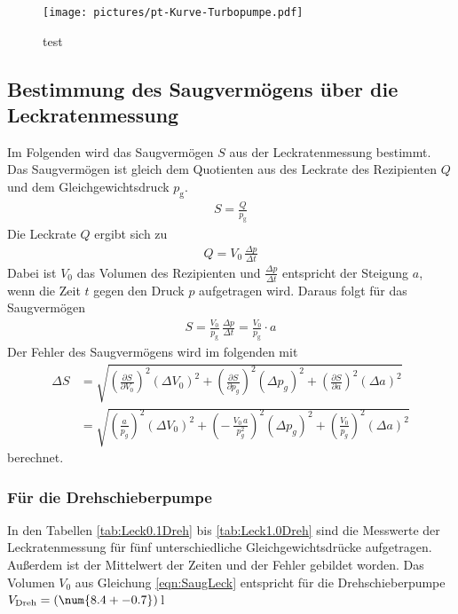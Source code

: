 \begin{figure}[H] %
  \centering
  \texttt{[image: pictures/pt-Kurve-Turbopumpe.pdf]}
  \caption{test}
  \label{fig:test}
\end{figure}





\subsection{Bestimmung des Saugvermögens über die Leckratenmessung}
Im Folgenden wird das Saugvermögen $S$ aus der Leckratenmessung bestimmt. Das Saugvermögen ist gleich dem Quotienten aus des Leckrate des Rezipienten $Q$ und dem Gleichgewichtsdruck $p_\text{g}$.
\begin{align}
  S = \frac{Q}{p_\text{g}}
\end{align}
Die Leckrate $Q$ ergibt sich zu
\begin{align}
  Q = V_0\, \frac{\Delta p}{\Delta t}
\end{align}
Dabei ist $V_0$ das Volumen des Rezipienten und $\frac{\Delta p}{\Delta t}$ entspricht der Steigung $a$, wenn die Zeit $t$ gegen den Druck $p$ aufgetragen wird. Daraus folgt für das Saugvermögen
\begin{align}\label{eqn:SaugLeck}
  S = \frac{V_0}{p_\text{g}}\, \frac{\Delta p}{\Delta t} = \frac{V_0}{p_\text{g}} \cdot a
\end{align}
Der Fehler des Saugvermögens wird im folgenden mit
\begin{align*}
  \Delta S &= \sqrt{ \left(\frac{\partial S}{\partial V_0} \right)^2 (\Delta V_0)^2 + \left(\frac{\partial S}{\partial p_g} \right)^2 (\Delta p_g)^2 + \left(\frac{\partial S}{\partial a} \right)^2 (\Delta a)^2 } \\
  &= \sqrt{ \left(\frac{a}{p_g} \right)^2 (\Delta V_0)^2 + \left(-\,\frac{V_0\,a}{p_g^2} \right)^2 (\Delta p_g)^2 + \left(\frac{V_0}{p_g} \right)^2 (\Delta a)^2 }
\end{align*}
berechnet.

\subsubsection{Für die Drehschieberpumpe}
In den Tabellen \eqref{tab:Leck0.1Dreh} bis \eqref{tab:Leck1.0Dreh} sind die Messwerte der Leckratenmessung für fünf unterschiedliche Gleichgewichtsdrücke aufgetragen. Außerdem ist der Mittelwert der Zeiten und der Fehler gebildet worden. Das Volumen $V_0$ aus Gleichung \eqref{eqn:SaugLeck} entspricht für die Drehschieberpumpe $V_\text{Dreh} = (\num{8.4 +- 0.7})$\,l

